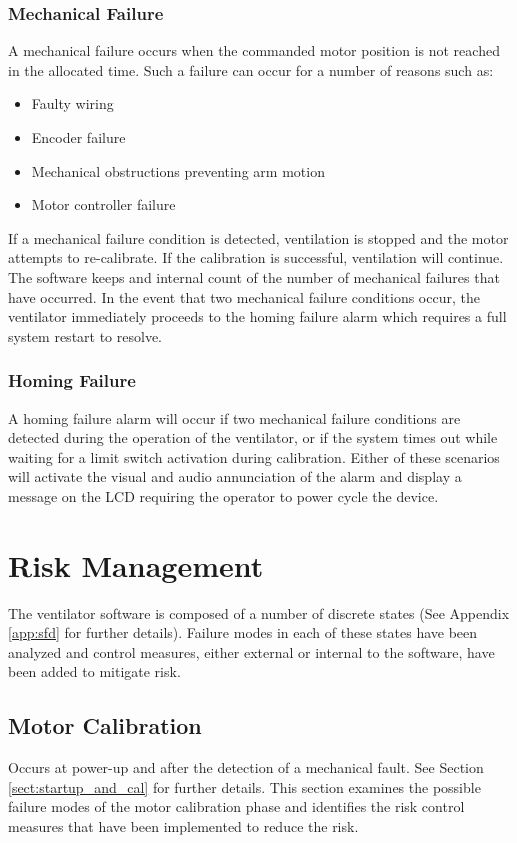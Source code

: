 \documentclass[]{article}
\begin{document}
\subsubsection{Mechanical Failure}
A mechanical failure occurs when the commanded motor position is not reached in the allocated time.  Such a failure can occur for a number of reasons such as:
\begin{itemize}
	\item Faulty wiring
	\item Encoder failure
	\item Mechanical obstructions preventing arm motion
	\item Motor controller failure
\end{itemize}
If a mechanical failure condition is detected, ventilation is stopped and the motor attempts to re-calibrate.  If the calibration is successful, ventilation will continue.  The software keeps and internal count of the number of mechanical failures that have occurred.  In the event that two mechanical failure conditions occur, the ventilator immediately proceeds to the homing failure alarm which requires a full system restart to resolve.

\subsubsection{Homing Failure}
A homing failure alarm will occur if two mechanical failure conditions are detected during the operation of the ventilator, or if the system times out while waiting for a limit switch activation during calibration.  Either of these scenarios will activate the visual and audio annunciation of the alarm and display a message on the LCD requiring the operator to power cycle the device.


\clearpage
\section{Risk Management}
\label{sect:risk}

The ventilator software is composed of a number of discrete states (See Appendix \ref{app:sfd} for further details). Failure modes in each of these states have been analyzed and control measures, either external or internal to the software, have been added to mitigate risk.

\subsection{Motor Calibration}
Occurs at power-up and after the detection of a mechanical fault.  See Section \ref{sect:startup_and_cal} for further details. This section examines the possible failure modes of the motor calibration phase and identifies the risk control measures that have been implemented to reduce the risk.
\end{document}
